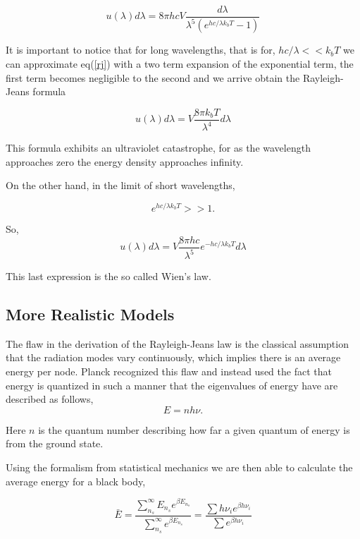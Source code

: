 \documentclass[10pt,twoside,openright]{memoir}
\begin{document}
\begin{equation} \label{rj}
u(\lambda ) d \lambda = 8 \pi h c V \frac{d \lambda}{\lambda^5 (e^{hc/\lambda k_{b} T}-1)}
\end{equation}

It is important to notice that for long wavelengths, that is for, $hc/\lambda << k_b T$ we can approximate eq(\ref{rj}) with a two term expansion of the exponential term, the first term becomes negligible to the second and we arrive  obtain the Rayleigh-Jeans formula

\begin{equation}
u(\lambda ) d \lambda = V\frac{8 \pi k_b T}{\lambda^4} d\lambda
\end{equation}

This formula exhibits an ultraviolet catastrophe, for as the wavelength approaches zero the energy density approaches infinity.

On the other hand, in the limit of short wavelengths,

$$ e^{hc/\lambda k_b T} >> 1.$$

So,
\begin{equation}
u(\lambda ) d \lambda = V\frac{8 \pi hc}{\lambda^5}e^{-hc/\lambda k_b T} d\lambda
\end{equation}

This last expression is the so called Wien's law.

\subsection{\label{sec:level1} More Realistic Models}
The flaw in the derivation of the Rayleigh-Jeans law is the classical assumption that the radiation modes vary continuously, which implies there is an average energy per node. Planck recognized this flaw and instead used the fact that energy is quantized in such a manner that the eigenvalues of energy have are described as follows,
\begin{equation}
E = n h \nu.
\end{equation}

Here $n$ is the quantum number describing how far a given quantum of energy is from the ground state.

Using the formalism from statistical mechanics we are then able to calculate the average energy for a black body,

\begin{equation} \label{planck}
\bar{E} = \frac{ \sum_{n_s}^{\infty} E_{n_s} e^{\beta E_{n_s}} }{\sum_{n_s}^{\infty} e^{\beta E_{n_s}}} = \frac{\sum h \nu_i e^{\beta h \nu_i}}{\sum e^{\beta h \nu_i} }
\end{equation}
\end{document}
